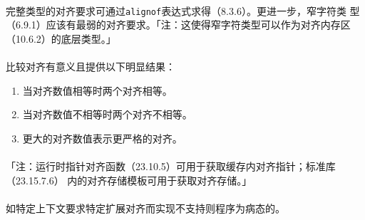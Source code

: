 \paragraph{}
完整类型的对齐要求可通过\texttt{alignof}表达式求得（8.3.6）。更进一步，窄字符类
型（6.9.1）应该有最弱的对齐要求。「注：这使得窄字符类型可以作为对齐内存区
（10.6.2）的底层类型。」

\paragraph{}
比较对齐有意义且提供以下明显结果：
\begin{enumerate}
  \item{当对齐数值相等时两个对齐相等。}
  \item{当对齐数值不相等时两个对齐不相等。}
  \item{更大的对齐数值表示更严格的对齐。}
\end{enumerate}

\paragraph{}
「注：运行时指针对齐函数（23.10.5）可用于获取缓存内对齐指针；标准库（23.15.7.6）
内的对齐存储模板可用于获取对齐存储。」

\paragraph{}
如特定上下文要求特定扩展对齐而实现不支持则程序为病态的。
